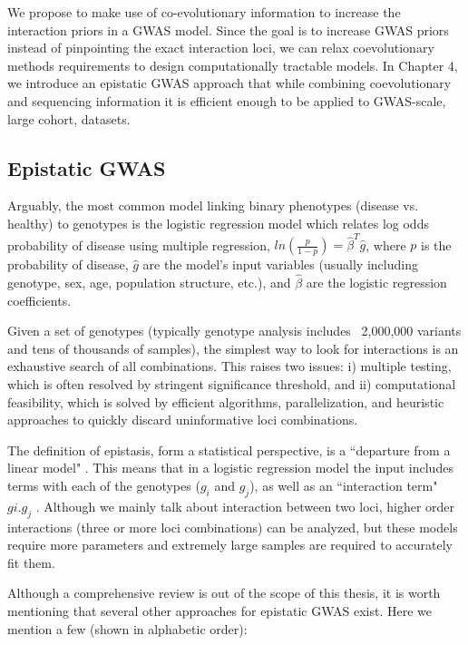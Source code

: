 We propose to make use of co-evolutionary information to increase the interaction priors in a GWAS model. Since the goal is to increase GWAS priors instead of pinpointing the exact interaction loci, we can relax coevolutionary methods requirements to design computationally tractable models. In Chapter 4, we introduce an epistatic GWAS approach that while combining coevolutionary and sequencing information it is efficient enough to be applied to GWAS-scale, large cohort, datasets.

\subsection{Epistatic GWAS }

Arguably, the most common model linking binary phenotypes (disease vs. healthy) to genotypes is the logistic regression model which relates log odds probability of disease using multiple regression, $ln(\frac{p}{1-p}) = \hat{\beta}^T \hat{g}$, where $p$ is the probability of disease, $\hat{g}$ are the model’s input variables (usually including genotype, sex, age, population structure, etc.), and $\hat{\beta}$ are the logistic regression coefficients. 

Given a set of genotypes (typically genotype analysis includes ~2,000,000 variants and tens of thousands of samples), the simplest way to look for interactions is an exhaustive search of all combinations. This raises two issues: i) multiple testing, which is often resolved by stringent significance threshold, and ii) computational feasibility, which is solved by efficient algorithms, parallelization, and heuristic approaches to quickly discard uninformative loci combinations.

The definition of epistasis, form a statistical perspective, is a ``departure from a linear model" \cite{cordell2009detecting}. This means that in a logistic regression model the input includes terms with each of the genotypes ($g_i$ and $g_j$), as well as an ``interaction term" $gi . g_j$ \cite{cordell2002epistasis}. Although we mainly talk about interaction between two loci, higher order interactions (three or more loci combinations) can be analyzed, but these models require more parameters and extremely large samples are required to accurately fit them.

Although a comprehensive review is out of the scope of this thesis, it is worth mentioning that several other approaches for epistatic GWAS exist. Here we mention a few (shown in alphabetic order):

